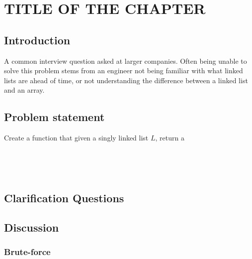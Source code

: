%

\chapter{TITLE OF THE CHAPTER}
\label{ch:list_reverse}
\section*{Introduction}
A common interview question asked at larger companies.
Often being unable to solve this problem stems from an engineer not being familiar with what linked lists are ahead of time, or not understanding the difference between a linked list and an array.

\section{Problem statement}
\begin{exercise}
Create a function that given a singly linked list $L$, return a
\end{exercise}


\begin{example}
	\hfill \
	
\end{example}

\begin{example}
	\hfill \
	
\end{example}

\section{Clarification Questions}

\begin{QandA}
	\item 
	\begin{answered}
		\textit{}
	\end{answered}
	
\end{QandA}

\section{Discussion}
\label{list_reverse:sec:discussion}


\subsection{Brute-force}
\label{list_reverse:sec:bruteforce}



